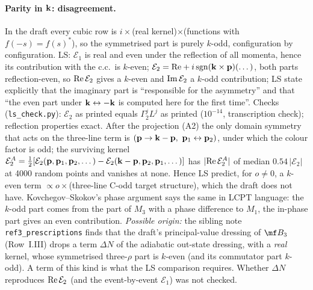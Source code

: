 \paragraph{Parity in $\mathbf{k}$: disagreement.} In the draft every cubic row is $i\times$(real kernel)$\times$(functions with $f(-s)=f(s)^*$), so the symmetrised part is purely $k$-odd, configuration by configuration. LS: $\mathcal E_1$ is real and even under the reflection of all momenta, hence its contribution with the c.c.\ is $k$-even; $\mathcal E_2={\rm Re}+i\,{\rm sgn}(\mathbf{k}\times\mathbf{p})(\dots)$, both parts reflection-even, so ${\rm Re}\,\mathcal E_2$ gives a $k$-even and ${\rm Im}\,\mathcal E_2$ a $k$-odd contribution; LS state explicitly that the imaginary part is ``responsible for the asymmetry'' and that ``the even part under $\mathbf{k}\leftrightarrow-\mathbf{k}$ is computed here for the first time''. Checks (\texttt{ls\_check.py}): $\mathcal E_2$ as printed equals $\Gamma_2^jL^j$ as printed ($10^{-14}$, transcription check); reflection properties exact. After the projection (A2) the only domain symmetry that acts on the three-line term is $(\mathbf{p}\to\mathbf{k}-\mathbf{p},\ \mathbf{p}_1\leftrightarrow\mathbf{p}_2)$, under which the colour factor is odd; the surviving kernel $\mathcal E_2^A=\frac12[\mathcal E_2(\mathbf{p},\mathbf{p}_1,\mathbf{p}_2,\dots)-\mathcal E_2(\mathbf{k}-\mathbf{p},\mathbf{p}_2,\mathbf{p}_1,\dots)]$ has $|{\rm Re}\,\mathcal E_2^A|$ of median $0.54\,|\mathcal E_2|$ at 4000 random points and vanishes at none. Hence LS predict, for $o\neq0$, a $k$-even term $\propto o\times$(three-line C-odd target structure), which the draft does not have. Kovchegov--Skokov's phase argument says the same in LCPT language: the $k$-odd part comes from the part of $M_3$ with a phase difference to $M_1$, the in-phase part gives an even contribution. \emph{Possible origin:} the sibling note \texttt{ref3\_prescriptions} finds that the draft's principal-value dressing of $\mf B_3$ (Row~I.III) drops a term $\Delta N$ of the adiabatic out-state dressing, with a \emph{real} kernel, whose symmetrised three-$\rho$ part is $k$-even (and its commutator part $k$-odd). A term of this kind is what the LS comparison requires. Whether $\Delta N$ reproduces ${\rm Re}\,\mathcal E_2$ (and the event-by-event $\mathcal E_1$) was not checked.
